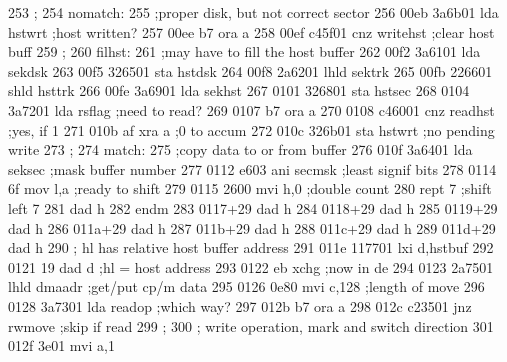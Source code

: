 253                ;
254                nomatch:
255                          ;proper disk, but not correct sector
256    00eb 3a6b01           lda      hstwrt                 ;host written?
257    00ee b7               ora      a
258    00ef c45f01           cnz      writehst               ;clear host buff
259                ;
260                filhst:
261                          ;may have to fill the host buffer
262    00f2 3a6101           lda      sekdsk
263    00f5 326501           sta      hstdsk
264    00f8 2a6201           lhld     sektrk
265    00fb 226601           shld     hsttrk
266    00fe 3a6901           lda      sekhst
267    0101 326801           sta      hstsec
268    0104 3a7201           lda      rsflag                 ;need to read?
269    0107 b7               ora      a
270    0108 c46001           cnz      readhst                ;yes, if 1
271    010b af               xra      a                      ;0 to accum
272    010c 326b01           sta      hstwrt                 ;no pending write
273                          ;
274                match:
275                          ;copy data to or from buffer
276    010f 3a6401           lda      seksec                 ;mask buffer number
277    0112 e603             ani      secmsk                 ;least signif bits
278    0114 6f               mov      l,a                    ;ready to shift
279    0115 2600             mvi      h,0                    ;double count
280                          rept     7                      ;shift left 7
281                          dad      h
282                          endm
283    0117+29               dad      h
284    0118+29               dad      h
285    0119+29               dad      h
286    011a+29               dad      h
287    011b+29               dad      h
288    011c+29               dad      h
289    011d+29               dad      h
290                ;         hl has relative host buffer address
291    011e 117701           lxi      d,hstbuf
292    0121 19               dad      d                      ;hl = host address
293    0122 eb               xchg                            ;now in de
294    0123 2a7501           lhld     dmaadr                 ;get/put cp/m data
295    0126 0e80             mvi      c,128                  ;length of move
296    0128 3a7301           lda      readop                 ;which way?
297    012b b7               ora      a
298    012c c23501           jnz      rwmove                 ;skip if read
299                ;
300                ;         write operation, mark and switch direction
301    012f 3e01             mvi      a,1
